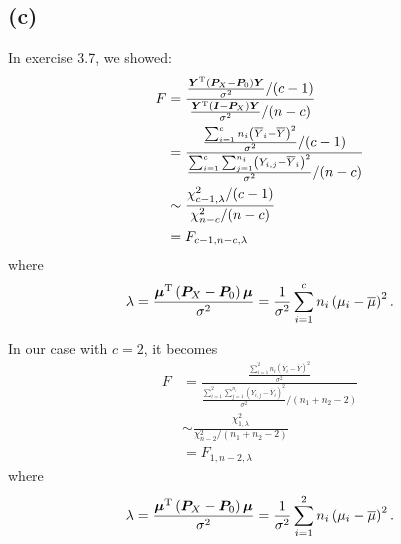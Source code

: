 \documentclass[a4paper]{article}
\begin{document}
\subsection{(c)}
In exercise 3.7, we showed:
\begin{align*}
F &= \frac{\frac{\bm{Y}^{\rm T}\left(\bm{P}_{X} -\bm{P}_{0} \right)\bm{Y}}{\sigma^2}/(c-1)}{\frac{\bm{Y}^{\rm T}\left(\bm{I} -\bm{P}_{X}\right)\bm{Y}}{\sigma^2}/(n-c)}\\
&= \frac{\frac{\sum_{i=1}^{c} n_{i}\left(\overline{Y}_{i} - \overline{Y}\right)^2}{\sigma^2}/(c-1)}{\frac{\sum_{i=1}^{c} \sum_{j=1}^{n_{i}} \left(Y_{i,j} - \overline{Y}_{i} \right)^2}{\sigma^2}/(n-c)}\\
&\sim \frac{\chi_{c-1, \lambda}^2 / (c-1)}{\chi_{n-c}^2 / (n-c)}\\
&= F_{c-1,n-c,\lambda}
\end{align*}
where
\begin{align*}
\lambda = \frac{\bm{\mu}^{\rm T}\left(\bm{P}_{X} -\bm{P}_{0} \right)\bm{\mu}}{\sigma^2} = \frac{1}{\sigma^2} \sum_{i=1}^{c} n_{i}\left(\mu_{i} - \overline{\mu}\right)^2.
\end{align*}

In our case with $c = 2$, it becomes
\begin{align*}
F &= \frac{\frac{\sum_{i=1}^{2} n_{i}\left(\overline{Y}_{i} - \overline{Y}\right)^2}{\sigma^2}}{\frac{\sum_{i=1}^{2} \sum_{j=1}^{n_{i}} \left(Y_{i,j} - \overline{Y}_{i} \right)^2}{\sigma^2}/(n_{1}+n_{2}-2)}\\
&\sim \frac{\chi_{1, \lambda}^2}{\chi_{n-2}^2 / (n_{1}+n_{2}-2)}\\
&= F_{1,n-2,\lambda}
\end{align*}
where
\begin{align*}
\lambda = \frac{\bm{\mu}^{\rm T}\left(\bm{P}_{X} -\bm{P}_{0} \right)\bm{\mu}}{\sigma^2} = \frac{1}{\sigma^2} \sum_{i=1}^{2} n_{i}\left(\mu_{i} - \overline{\mu}\right)^2.
\end{align*}
\end{document}
